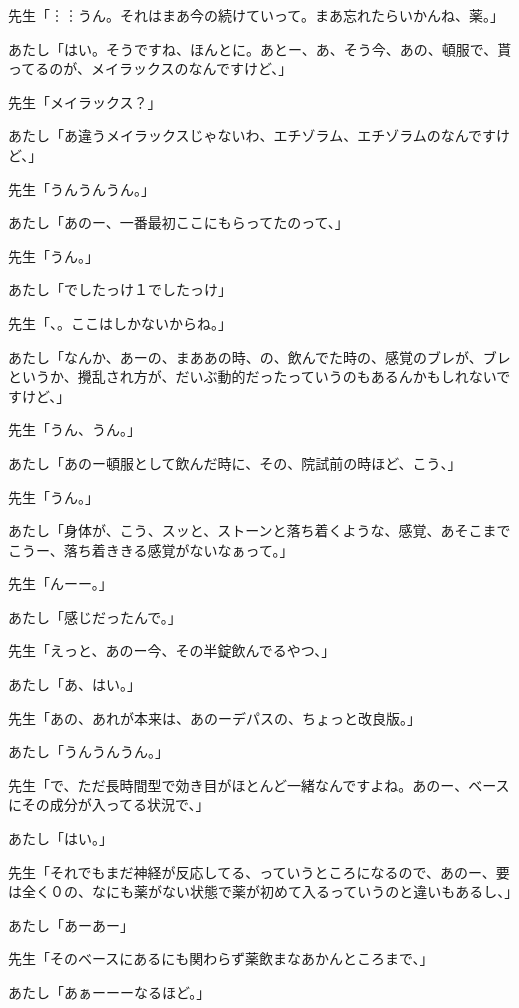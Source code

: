 \documentclass[b5j,twoside,twocolumn]{utarticle}
\begin{document}
\begin{description}
\item 先生「︙︙うん。それはまあ今の続けていって。まあ忘れたらいかんね、薬。」
\item あたし「はい。そうですね、ほんとに。あとー、あ、そう今、あの、頓服で、貰ってるのが、メイラックスのなんですけど、」
\item 先生「メイラックス？」
\item あたし「あ違うメイラックスじゃないわ、エチゾラム、エチゾラムのなんですけど、」
\item 先生「うんうんうん。」
\item あたし「あのー、一番最初ここにもらってたのって、」
\item 先生「うん。」
\item あたし「でしたっけ１でしたっけ」
\item 先生「、。ここはしかないからね。」
\item あたし「なんか、あーの、まああの時、の、飲んでた時の、感覚のブレが、ブレというか、攪乱され方が、だいぶ動的だったっていうのもあるんかもしれないですけど、」
\item 先生「うん、うん。」
\item あたし「あのー頓服として飲んだ時に、その、院試前の時ほど、こう、」
\item 先生「うん。」
\item あたし「身体が、こう、スッと、ストーンと落ち着くような、感覚、あそこまでこうー、落ち着ききる感覚がないなぁって。」
\item 先生「んーー。」
\item あたし「感じだったんで。」
\item 先生「えっと、あのー今、その半錠飲んでるやつ、」
\item あたし「あ、はい。」
\item 先生「あの、あれが本来は、あのーデパスの、ちょっと改良版。」
\item あたし「うんうんうん。」
\item 先生「で、ただ長時間型で効き目がほとんど一緒なんですよね。あのー、ベースにその成分が入ってる状況で、」
\item あたし「はい。」
\item 先生「それでもまだ神経が反応してる、っていうところになるので、あのー、要は全く０の、なにも薬がない状態で薬が初めて入るっていうのと違いもあるし、」
\item あたし「あーあー」
\item 先生「そのベースにあるにも関わらず薬飲まなあかんところまで、」
\item あたし「あぁーーーなるほど。」

\end{description}
\end{document}
